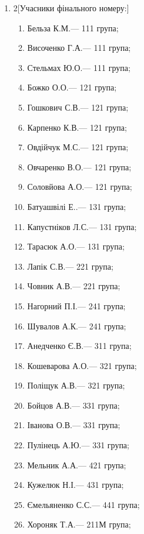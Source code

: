 \documentclass[
	a4paper,
	12pt,
	oneside,
	draft
]{extreport}
\begin{document}
\begin{enumerate}[topsep=0pt,itemsep=-1ex,partopsep=1ex,parsep=1ex]
\item 
\begin{multicols}{2}[Учасники фінального номеру:] 
\begin{enumerate}[topsep=0pt,itemsep=-1ex,partopsep=1ex,parsep=1ex,label=\arabic*.]
\item Бельза К.М.\hfill --- 111 група;
\item Височенко Г.А.\hfill --- 111 група;
\item Стельмах Ю.О.\hfill --- 111 група;
\item Божко О.О.\hfill --- 121 група;
\item Гошкович С.В.\hfill --- 121 група;
\item Карпенко К.В.\hfill --- 121 група;
\item Овдійчук М.С.\hfill --- 121 група;
\item Овчаренко В.О.\hfill --- 121 група;
\item Соловйова А.О.\hfill --- 121 група;
\item Батуашвілі Е..\hfill --- 131 група;
\item Капустніков Л.С.\hfill --- 131 група;
\item Тарасюк А.О.\hfill --- 131 група;
\item Лапік С.В.\hfill --- 221 група;
\item Човник А.В.\hfill --- 221 група;
\item Нагорний П.І.\hfill --- 241 група;
\item Шувалов А.К.\hfill --- 241 група;
\item Анедченко Є.В.\hfill --- 311 група;
\item Кошеварова А.О.\hfill --- 321 група;
\item Поліщук А.В.\hfill --- 321 група;
\item Бойцов А.В.\hfill --- 331 група;
\item Іванова О.В.\hfill --- 331 група;
\item Пулінець А.Ю.\hfill --- 331 група;
\item Мельник А.А.\hfill --- 421 група;
\item Кужелюк Н.І.\hfill --- 431 група;
\item Ємельяненко С.С.\hfill --- 441 група;
\item Хороняк Т.А.\hfill --- 211М група;
\end{enumerate}
\end{multicols}




\end{enumerate}
\end{document}
